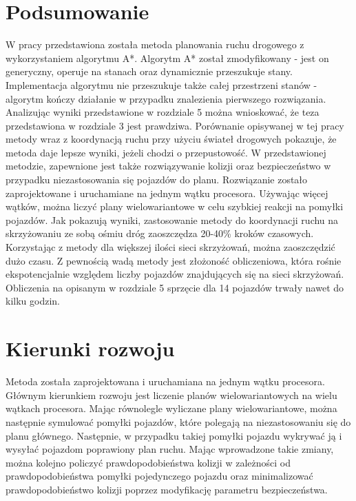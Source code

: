  \label{chap:conclusions}

\section {Podsumowanie}

W pracy przedstawiona została metoda planowania ruchu drogowego z wykorzystaniem algorytmu A*. Algorytm A* został zmodyfikowany - jest on generyczny, operuje na stanach oraz dynamicznie przeszukuje stany. Implementacja algorytmu nie przeszukuje także całej przestrzeni stanów - algorytm kończy działanie w przypadku znalezienia pierwszego rozwiązania.
\newline
\indent
Analizując wyniki przedstawione w rozdziale 5 można wnioskować, że teza przedstawiona w rozdziale 3 jest prawdziwa. Porównanie opisywanej w tej pracy metody wraz z koordynacją ruchu przy użyciu świateł drogowych pokazuje, że metoda daje lepsze wyniki, jeżeli chodzi o przepustowość. W przedstawionej metodzie, zapewnione jest także rozwiązywanie kolizji oraz bezpieczeństwo w przypadku niezastosowania się pojazdów do planu. Rozwiązanie zostało zaprojektowane i uruchamiane na jednym wątku procesora. Używając więcej wątków, można liczyć plany wielowariantowe w celu szybkiej reakcji na pomyłki pojazdów.
\newline
\indent
Jak pokazują wyniki, zastosowanie metody do koordynacji ruchu na skrzyżowaniu ze sobą ośmiu dróg zaoszczędza 20-40\% kroków czasowych. Korzystając z metody dla większej ilości sieci skrzyżowań, można zaoszczędzić dużo czasu.
\newline
\indent
Z pewnością wadą metody jest złożoność obliczeniowa, która rośnie ekspotencjalnie względem liczby pojazdów znajdujących się na sieci skrzyżowań. Obliczenia na opisanym w rozdziale 5 sprzęcie dla 14 pojazdów trwały nawet do kilku godzin.

\section{Kierunki rozwoju}

Metoda została zaprojektowana i uruchamiana na jednym wątku procesora. Głównym kierunkiem rozwoju jest liczenie planów wielowariantowych na wielu wątkach procesora. Mając równolegle wyliczane plany wielowariantowe, można następnie symulować pomyłki pojazdów, które polegają na niezastosowaniu się do planu głównego. Następnie, w przypadku takiej pomyłki pojazdu wykrywać ją i wysyłać pojazdom poprawiony plan ruchu. Mając wprowadzone takie zmiany, można kolejno policzyć prawdopodobieństwa kolizji w zależności od prawdopodobieństwa pomyłki pojedynczego pojazdu oraz minimalizować prawdopodobieństwo kolizji poprzez modyfikację parametru bezpieczeństwa.
